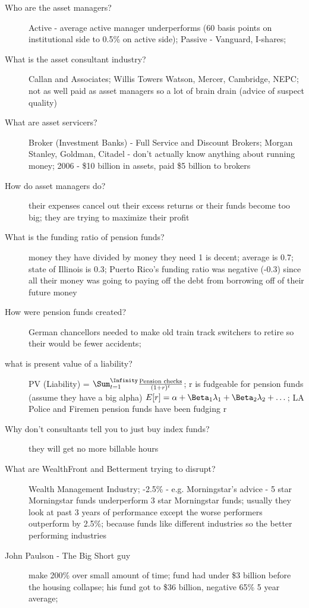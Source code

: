 \documentclass[11pt]{article}
\begin{document}
\begin{description}
\item[Who are the asset managers?]
  Active - average active manager underperforms (60 basis points on institutional side to 0.5\% on active side);
  Passive - Vanguard, I-shares;
\item[What is the asset consultant industry?]
  Callan and Associates; Willis Towers Watson, Mercer, Cambridge, NEPC;
  not as well paid as asset managers so a lot of brain drain (advice of suspect quality)
\item[What are asset servicers?]
  Broker (Investment Banks) - Full Service and Discount Brokers;
  Morgan Stanley, Goldman, Citadel - don't actually know anything about running money;
  2006 - \$10 billion in assets, paid \$5 billion to brokers
\item[How do asset managers do?]
  their expenses cancel out their excess returns or their funds become too big;
  they are trying to maximize their profit
\item[What is the funding ratio of pension funds?]
  money they have divided by money they need
  1 is decent;
  average is 0.7;
  state of Illinois is 0.3;
  Puerto Rico's funding ratio was negative (-0.3) since all their money was going to paying off the debt from borrowing off of their future money
\item[How were pension funds created?]
  German chancellors needed to make old train track switchers to retire so their would be fewer accidents;
\item[what is present value of a liability?]
  PV (Liability) = $\Sum_{t=1}^{\Infinity} \frac{\text{Pension checks}}{(1 + r)^t}$;
  r is fudgeable for pension funds (assume they have a big alpha)
  $E[r] = \alpha + \Beta_1\lambda_1 + \Beta_2\lambda_2 + \dots$;
  LA Police and Firemen pension funds have been fudging r
\item[Why don't consultants tell you to just buy index funds?]
  they will get no more billable hours
\item[What are WealthFront and Betterment trying to disrupt?]
  Wealth Management Industry;
  -2.5\% - e.g. Morningstar's advice - 5 star Morningstar funds underperform 3 star Morningstar funds;
  usually they look at past 3 years of performance except the worse performers outperform by 2.5\%;
  because funds like different industries so the better performing industries
\item[John Paulson - The Big Short guy]
  make 200\% over small amount of time;
  fund had under \$3 billion before the housing collapse;
  his fund got to \$36 billion, negative 65\% 5 year average;

\end{description}
\end{document}

